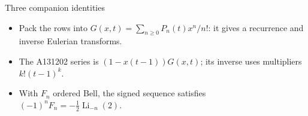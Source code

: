 \documentclass{beamer}
\begin{document}
\appendix
\begin{frame}{Three companion identities}
  \begin{itemize}
    \item Pack the rows into $G(x,t)=\sum_{n\ge0}P_n(t)x^n/n!$: it gives a recurrence and inverse Eulerian transforms.
    \item The A131202 series is $(1-x(t-1))G(x,t)$; its inverse uses multipliers $k!(t-1)^k$.
    \item With $F_n$ ordered Bell, the signed sequence satisfies $(-1)^nF_n=-\tfrac12\operatorname{Li}_{-n}(2)$.
  \end{itemize}
\end{frame}
\FormalVerification
\end{document}
